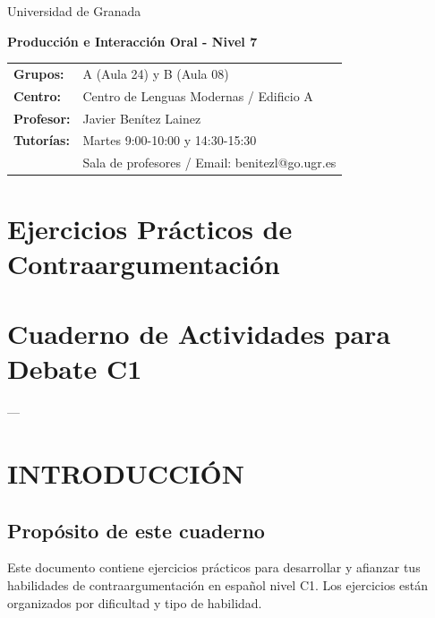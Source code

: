 \documentclass[a4paper,11pt]{article}
\begin{document}
\begin{center}
\small{Universidad de Granada}

\vspace{0.3cm}

\textbf{\large{Producción e Interacción Oral - Nivel 7}}

\vspace{0.4cm}

\small
\begin{tabular}{@{}ll@{}}
\textbf{Grupos:} & A (Aula 24) y B (Aula 08) \\
\textbf{Centro:} & Centro de Lenguas Modernas / Edificio A \\
\textbf{Profesor:} & Javier Benítez Lainez \\
\textbf{Tutorías:} & Martes 9:00-10:00 y 14:30-15:30 \\
& Sala de profesores / Email: benitezl@go.ugr.es
\end{tabular}
\end{center}

\vspace{0.5cm}
\section*{Ejercicios Prácticos de Contraargumentación}

\vspace{0.4cm}

\section{Cuaderno de Actividades para Debate C1}

\vspace{0.2cm}

---

\vspace{0.2cm}

\section{INTRODUCCIÓN}

\vspace{0.2cm}

\subsection{Propósito de este cuaderno}

Este documento contiene ejercicios prácticos para desarrollar y afianzar tus habilidades de contraargumentación en español nivel C1. Los ejercicios están organizados por dificultad y tipo de habilidad.
\end{document}
